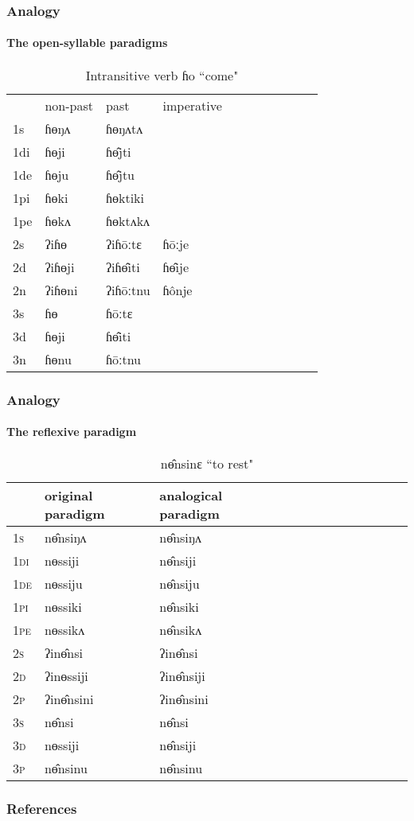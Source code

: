\documentclass[xcolor=table]{beamer}
\newcommand{\ipa}[1]{{\phon \mbox{#1}}} %
\newcommand{\grise}[1]{\cellcolor{lightgray}\textbf{#1}}
\begin{document}
  \begin{frame} 
 \frametitle{Analogy} 
 \framesubtitle{The open-syllable paradigms}  
  
 \begin{table}[H]
\label{o.vi}
\caption{Intransitive verb \ipa{ɦo} ``come" }
\begin{tabular}{l|l|l|l|l|l|l|l|l|l|l}  \toprule
&non-past & past & imperative \\ 
1s &ɦɵŋʌ &ɦɵŋʌtʌ \\ 
1di &ɦɵji &ɦɵ̂jti   \\
1de &ɦɵju &ɦɵ̂jtu   \\ 
1pi &ɦɵki &ɦɵktiki   \\ 
1pe &ɦɵkʌ &ɦɵktʌkʌ   \\ 
2s & ʔiɦɵ & ʔiɦōːtɛ &ɦōːje  \\ 
2d & ʔiɦɵji & ʔiɦɵ̂iti &ɦɵ̂ije    \\
2n & ʔiɦɵni  & ʔiɦōːtnu \grise{}&ɦônje  \\ 
3s & ɦɵ & ɦōːtɛ   \\ 
3d & ɦɵji & ɦɵ̂iti     \\ 
3n & ɦɵnu  & ɦōːtnu\grise{} \\ 
\bottomrule
\end{tabular}
\end{table}
  \end{frame} 
  
  \begin{frame} 
 \frametitle{Analogy} 
 \framesubtitle{The reflexive paradigm}
 
\begin{table}[H]
 \centering 
\caption{ \ipa{nɵ̂nsinɛ}  ``to rest"  } \label{tab:no}
\begin{tabular}{l|l|l|l|l|l|l|l|l|l|l|l|l} 
 \toprule
&original paradigm& analogical paradigm \\
\midrule
\textsc{1s} & \ipa{nɵ̂nsiŋʌ} &\ipa{nɵ̂nsiŋʌ} \\ 
\textsc{1di} & \ipa{nɵssiji} &\ipa{nɵ̂nsiji} \grise{}  \\
\textsc{1de} & \ipa{nɵssiju} & \ipa{nɵ̂nsiju} \grise{}  \\ 
\textsc{1pi} & \ipa{nɵssiki} & \ipa{nɵ̂nsiki}  \grise{} \\ 
\textsc{1pe} & \ipa{nɵssikʌ} & \ipa{nɵ̂nsikʌ} \grise{}  \\ 
\textsc{2s} & \ipa{ʔinɵ̂nsi} & \ipa{ʔinɵ̂nsi}   \\ 
\textsc{2d} & \ipa{ʔinɵssiji} & \ipa{ʔinɵ̂nsiji}  \grise{}  \\
\textsc{2p} & \ipa{ʔinɵ̂nsini}  & \ipa{ʔinɵ̂nsini}    \\ 
\textsc{3s} & \ipa{nɵ̂nsi} & \ipa{nɵ̂nsi}   \\ 
\textsc{3d} & \ipa{nɵssiji} & \ipa{nɵ̂nsiji}  \grise{} \\ 
\textsc{3p} & \ipa{nɵ̂nsinu}  & \ipa{nɵ̂nsinu} \\ 
\bottomrule
\end{tabular}
\end{table}
 
  \end{frame}     
  
 \begin{frame} 
 \frametitle{References}
 
 

 \end{frame}
\end{document}
